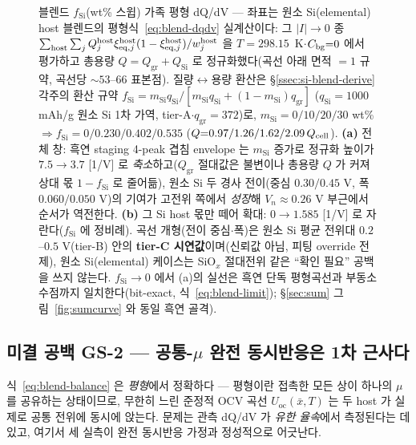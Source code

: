 \begin{figure}[t]
\caption{블렌드 $f_\mathrm{Si}$(wt\% 스윕) 가족 평형 dQ/dV --- 좌표는 원소 Si(elemental) host 블렌드의
평형식~\eqref{eq:blend-dqdv} 실계산이다:
그 $|I|\!\to\!0$ 종
$\sum_{\mathrm{host}}\sum_j Q_j^\mathrm{host}\xi_{\mathrm{eq},j}^\mathrm{host}(1-\xi_{\mathrm{eq},j}^\mathrm{host})/w_j^\mathrm{host}$
을 $T{=}298.15$~K$\cdot$$C_{\mathrm{bg}}{=}0$ 에서 평가하고 총용량 $Q{=}Q_\mathrm{gr}{+}Q_\mathrm{Si}$ 로
정규화했다(곡선 아래 면적 $=1$ 규약, 곡선당 $\sim$$53$--$66$ 표본점). 질량$\leftrightarrow$용량 환산은
§\ref{ssec:si-blend-derive} 각주의 환산 규약
$f_\mathrm{Si}=m_\mathrm{Si}q_\mathrm{Si}/[m_\mathrm{Si}q_\mathrm{Si}+(1{-}m_\mathrm{Si})q_\mathrm{gr}]$
($q_\mathrm{Si}{=}1000$ mAh/g 원소 Si 1차 가역\cite{limthongkul2003}, tier-A$\cdot$$q_\mathrm{gr}{=}372$)로,
$m_\mathrm{Si}{=}0/10/20/30$ wt\% $\Rightarrow f_\mathrm{Si}{=}0/0.230/0.402/0.535$
($Q{=}0.97/1.26/1.62/2.09\,Q_{\mathrm{cell}}$). \textbf{(a)} 전체 창: 흑연 staging 4-peak 겹침 envelope 는
$m_\mathrm{Si}$ 증가로 정규화 높이가 $7.5\!\to\!3.7$ [1/V] 로 \emph{축소}하고($Q_\mathrm{gr}$ 절대값은
불변이나 총용량 $Q$ 가 커져 상대 몫 $1{-}f_\mathrm{Si}$ 로 줄어듦), 원소 Si 두 경사 전이(중심 $0.30/0.45$
V, 폭 $0.060/0.050$ V)의 기여가 고전위 쪽에서 \emph{성장}해 $V_n\!\approx\!0.26$ V 부근에서 순서가
역전한다. \textbf{(b)} 그 Si host 몫만 떼어 확대: $0\!\to\!1.585$
[1/V] 로 자란다($f_\mathrm{Si}$ 에 정비례). 곡선 개형(전이 중심$\cdot$폭)은 원소 Si 평균 전위대
$0.2$--$0.5$ V\cite{obrovac_chevrier2014}(tier-B) 안의 \textbf{tier-C 시연값}이며(신뢰값 아님, 피팅
override 전제), 원소 Si(elemental) 케이스는 SiO$_x$ 절대전위 같은 ``확인 필요'' 공백을 쓰지 않는다.
$f_\mathrm{Si}\!\to\!0$ 에서 (a)의 실선은 흑연 단독 평형곡선과 부동소수점까지 일치한다(bit-exact,
식~\eqref{eq:blend-limit}); \S\ref{sec:sum} 그림~\ref{fig:sumcurve} 와 동일 흑연 골격).}
\label{fig:blend-family}
\end{figure}


\subsection{미결 공백 GS-2 --- 공통-$\mu$ 완전 동시반응은 1차 근사다}\label{ssec:si-blend-gs2}
식~\eqref{eq:blend-balance} 은 \emph{평형}에서 정확하다 --- 평형이란 접촉한 모든 상이 하나의 $\mu$ 를
공유하는 상태이므로, 무한히 느린 준정적 OCV 곡선 $U_\mathrm{oc}(\bar x,T)$ 는 두 host 가 실제로 공통 전위에
동시에 앉는다. 문제는 관측 dQ/dV 가 \emph{유한 율속}에서 측정된다는 데 있고, 여기서 세 실측이 완전
동시반응 가정과 정성적으로 어긋난다.

